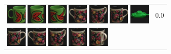 \begin{figure}[tbp]
\begin{center}
\begin{tabular}{m{11cm} | m{3cm} |}
\includegraphics[width=1cm]{coil/beeld-31.eps}
\includegraphics[width=1cm]{coil/beeld-32.eps}
\includegraphics[width=1cm]{coil/beeld-33.eps}
\includegraphics[width=1cm]{coil/beeld-61.eps}
\includegraphics[width=1cm]{coil/beeld-63.eps}
\includegraphics[width=1cm]{coil/beeld-60.eps}
\includegraphics[width=1cm]{coil/beeld-55.eps}
& {\scriptsize 0.0}
\\
\includegraphics[width=1cm]{coil/beeld-60.eps}
\includegraphics[width=1cm]{coil/beeld-61.eps}
\includegraphics[width=1cm]{coil/beeld-63.eps}
\includegraphics[width=1cm]{coil/beeld-62.eps}
\includegraphics[width=1cm]{coil/beeld-64.eps}

\end{tabular}
\end{center}
\end{figure}
